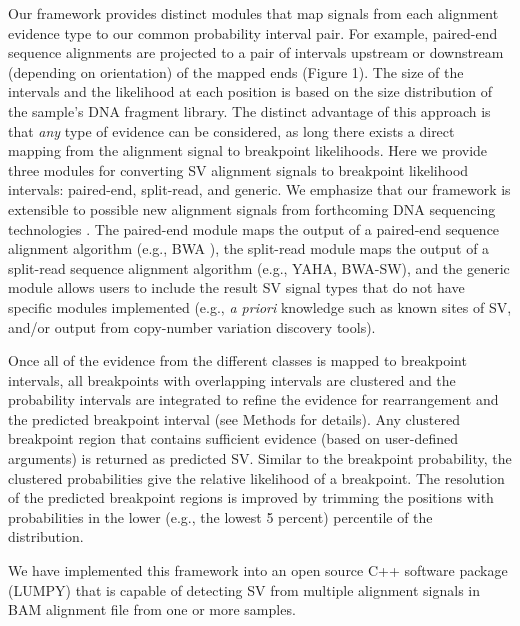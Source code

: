 \documentclass[11pt]{article}
\begin{document}
Our framework provides distinct modules that map signals from each alignment 
evidence type to our common probability interval pair.  For example, paired-end 
sequence alignments are projected to a pair of intervals upstream or downstream 
(depending on orientation) of the mapped ends (Figure 1).  The size of the 
intervals and the likelihood at each position is based on the size distribution
of the sample's DNA fragment library.  The distinct advantage of this approach
is that \emph{any} type of evidence can be considered, as long there exists
a direct mapping from the alignment signal to breakpoint likelihoods.
Here we provide three modules for converting SV alignment signals to breakpoint
likelihood intervals: paired-end, split-read, and generic.  We emphasize that
our framework is extensible to possible new alignment signals from forthcoming
DNA sequencing technologies \cite{OxfordNanopore}. The paired-end module maps 
the output of a paired-end sequence alignment algorithm 
(e.g., BWA \cite{li2009a}), the split-read module maps the output of a 
split-read sequence alignment algorithm (e.g., YAHA\cite{faust2012}, 
BWA-SW\cite{li2010}), and the generic module allows users to include the result 
SV signal types that do not have specific modules implemented (e.g., 
\emph{a priori} knowledge such as known sites of SV, and/or output from 
copy-number variation discovery tools).

Once all of the evidence from the different classes is mapped to breakpoint
intervals, all breakpoints with overlapping intervals are clustered and 
the probability intervals are integrated to refine the evidence for 
rearrangement and the predicted breakpoint interval (see Methods for details).  
Any clustered breakpoint region that contains sufficient evidence (based on 
user-defined arguments) is returned as predicted SV.  
Similar to the breakpoint probability, the clustered probabilities give the 
relative likelihood of a breakpoint.  The resolution of the predicted breakpoint
regions is improved by trimming the positions with probabilities 
in the lower (e.g., the lowest 5 percent) percentile of the distribution.

We have implemented this framework into an open source C++ software package 
(LUMPY) that is capable of detecting SV from multiple alignment signals in 
BAM alignment file from one or more samples.
\end{document}
